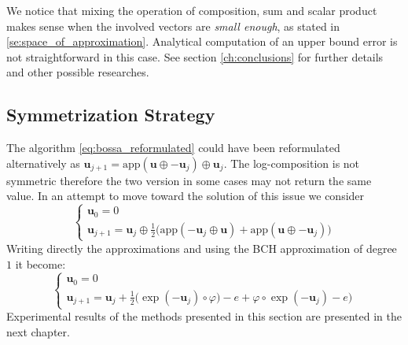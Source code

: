 We notice that mixing the operation of composition, sum and scalar product makes sense when the involved vectors are \emph{small enough}, as stated in \ref{se:space_of_approximation}. 
Analytical computation of an upper bound error is not straightforward in this case. See section \ref{ch:conclusions} for further details and other possible researches.

\subsection{Symmetrization Strategy}
The algorithm \ref{eq:bossa_reformulated} could have been reformulated alternatively as $\mathbf{u}_{j+1} =    \text{app}(\mathbf{u} \oplus  - \mathbf{u}_{j}  ) \oplus \mathbf{u}_{j}$. The log-composition is not symmetric therefore the two version in some cases may not return the same value. In an attempt to move toward the solution of this issue we consider
\begin{equation}\label{eq:bossa_symmetric}
\begin{cases}
\mathbf{u}_0 = 0 \\
\mathbf{u}_{j+1} = \mathbf{u}_{j} \oplus 
\frac{1}{2}
\big(  
\text{app}(-\mathbf{u}_{j}  \oplus  \mathbf{u} )
+
\text{app}(\mathbf{u} \oplus  - \mathbf{u}_{j}  )
\big)
\end{cases}
\end{equation}
Writing directly the approximations and using the BCH approximation of degree $1$ it become:
\begin{equation}
\begin{cases}
\mathbf{u}_0 = 0 \\
\mathbf{u}_{j+1} 
=
\mathbf{u}_{j} +  
\frac{1}{2}
\big(  
\exp(-\mathbf{u}_{j}) \circ \varphi ) - e
+
\varphi\circ\exp(-\mathbf{u}_{j}) - e
\big)
\end{cases}
\end{equation}
Experimental results of the methods presented in this section are presented in the next chapter. %











